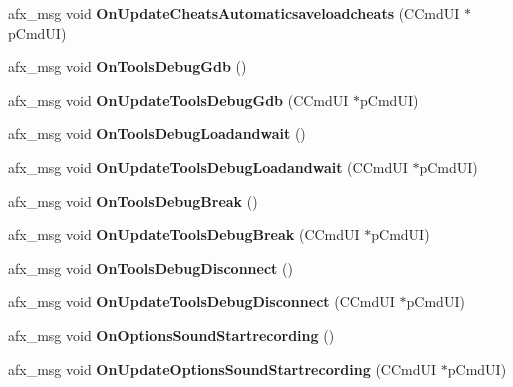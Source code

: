 \begin{DoxyCompactItemize}
afx\+\_\+msg void {\bfseries On\+Update\+Cheats\+Automaticsaveloadcheats} (C\+Cmd\+UI $\ast$p\+Cmd\+UI)
\item 
\mbox{\label{class_main_wnd_afd978409fe7d362576094249789ea364}} 
afx\+\_\+msg void {\bfseries On\+Tools\+Debug\+Gdb} ()
\item 
\mbox{\label{class_main_wnd_a0b78ffc6321596788767291e2d139e6f}} 
afx\+\_\+msg void {\bfseries On\+Update\+Tools\+Debug\+Gdb} (C\+Cmd\+UI $\ast$p\+Cmd\+UI)
\item 
\mbox{\label{class_main_wnd_a9a253419b0bc7b8b246b68fcaefc1668}} 
afx\+\_\+msg void {\bfseries On\+Tools\+Debug\+Loadandwait} ()
\item 
\mbox{\label{class_main_wnd_a747e0b43ebf87f4b3551767a9fce4d9e}} 
afx\+\_\+msg void {\bfseries On\+Update\+Tools\+Debug\+Loadandwait} (C\+Cmd\+UI $\ast$p\+Cmd\+UI)
\item 
\mbox{\label{class_main_wnd_af61485d2b07b79fb1efc1cc6437d1ab1}} 
afx\+\_\+msg void {\bfseries On\+Tools\+Debug\+Break} ()
\item 
\mbox{\label{class_main_wnd_ae3d32c8d517114261df5adc88ff0f2c9}} 
afx\+\_\+msg void {\bfseries On\+Update\+Tools\+Debug\+Break} (C\+Cmd\+UI $\ast$p\+Cmd\+UI)
\item 
\mbox{\label{class_main_wnd_aecca3d7d993909f95fe965275b73efae}} 
afx\+\_\+msg void {\bfseries On\+Tools\+Debug\+Disconnect} ()
\item 
\mbox{\label{class_main_wnd_a41dd5d381b27cae7a9f7d1d685d1ab09}} 
afx\+\_\+msg void {\bfseries On\+Update\+Tools\+Debug\+Disconnect} (C\+Cmd\+UI $\ast$p\+Cmd\+UI)
\item 
\mbox{\label{class_main_wnd_a61b3657a1df45da0e444c99fa5b298c5}} 
afx\+\_\+msg void {\bfseries On\+Options\+Sound\+Startrecording} ()
\item 
\mbox{\label{class_main_wnd_afe112a4df6bc333e8b7e6ffc3521fe5f}} 
afx\+\_\+msg void {\bfseries On\+Update\+Options\+Sound\+Startrecording} (C\+Cmd\+UI $\ast$p\+Cmd\+UI)

\end{DoxyCompactItemize}
